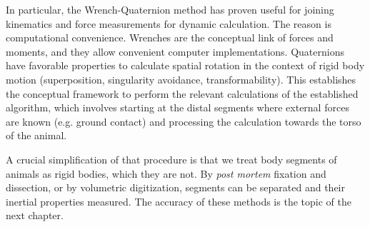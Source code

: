 In particular, the Wrench-Quaternion method \citep{Dumas2004} has proven useful for joining kinematics and force measurements for dynamic calculation.
The reason is computational convenience.
Wrenches are the conceptual link of forces and moments, and they allow convenient computer implementations.
Quaternions have favorable properties to calculate spatial rotation in the context of rigid body motion (superposition, singularity avoidance, transformability).
This establishes the conceptual framework to perform the relevant calculations of the established algorithm, which involves starting at the distal segments where external forces are known (e.g. ground contact) and processing the calculation towards the torso of the animal.


A crucial simplification of that procedure is that we treat body segments of animals as rigid bodies, which they are not.
By \emph{post mortem} fixation and dissection, or by volumetric digitization, segments can be separated and their inertial properties measured.
The accuracy of these methods is the topic of the next chapter.
